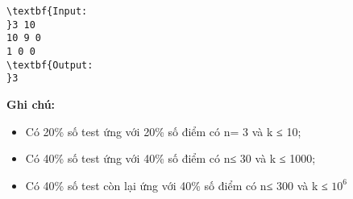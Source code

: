 \begin{verbatim}
\textbf{Input:
}3 10
10 9 0
1 0 0
\textbf{Output:
}3
\end{verbatim}

\textbf{\textbf{Ghi chú:}}
\begin{itemize}
	\item Có 20\% số test ứng với 20\% số điểm có n= 3 và k ≤ 10;
	\item Có 40\% số test ứng với 40\% số điểm có n≤ 30 và k ≤ 1000;
	\item Có 40\% số test còn lại ứng với 40\% số điểm có n≤ 300 và k ≤ $10^{6}$
\end{itemize}